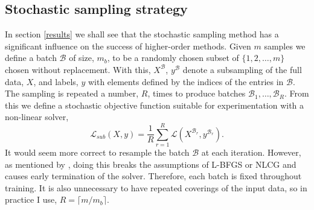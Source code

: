 \documentclass[11pt,twocolumn]{article}
\begin{document}
\subsection{Stochastic sampling strategy}\label{stoch_strategy}
In section \ref{results} we shall see that the stochastic sampling method has a significant influence on the success of higher-order methods. Given $m$ samples we define a batch $\mathcal{B}$ of size, $m_b$, to be a randomly chosen subset of $\{1,2,\ldots,m\}$ chosen without replacement. With this, $X^\mathcal{B}$, $y^\mathcal{B}$ denote a subsampling of the full data, $X$, and labels, $y$ with elements defined by the indices of the entries in  $\mathcal{B}$. The sampling is repeated a number, $R$, times to produce batches  $\mathcal{B}_1, \ldots, \mathcal{B}_R$. From this we define a stochastic objective function suitable for experimentation with a non-linear solver,
\begin{equation}
\mathcal{L}_{sub}(X,y)=\frac{1}{R}\sum_{r=1}^R \mathcal{L}(X^{\mathcal{B}_r}, y^{\mathcal{B}_r}).\label{stoch_resample}
\end{equation}
It would seem more correct to resample the batch $\mathcal{B}$ at each iteration. However, as mentioned by \citet{Martens:Deep}, doing this breaks the assumptions of L-BFGS or NLCG and causes early termination of the solver. Therefore, each batch is fixed throughout training. It is also unnecessary to have repeated coverings of the input data, so in practice I use, $R=\lceil m/m_b \rceil$.

\end{document}
